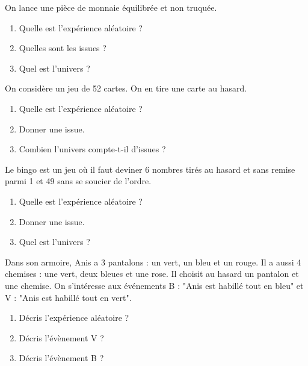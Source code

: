 \begin{pageAD} 


 
On lance une pièce de monnaie équilibrée et non truquée.

\begin{enumerate}
\item Quelle est l'expérience aléatoire ? 
\item Quelles sont les issues ?
\item Quel est l'univers ?
\end{enumerate}



On considère un jeu de 52 cartes. On en tire une carte au hasard. 
\begin{enumerate}
\item Quelle est l'expérience aléatoire ?
\item Donner une issue.
\item Combien l'univers compte-t-il d'issues ?
\end{enumerate}



Le bingo est un jeu où il faut deviner 6 nombres tirés au hasard et sans remise parmi 1 et 49 sans se soucier de l'ordre.
\begin{enumerate}
\item Quelle est l'expérience aléatoire ?
\item Donner une issue.
\item Quel est l'univers ?
\end{enumerate}


 



 

Dans son armoire, Anis a 3 pantalons : un vert, un bleu et un rouge. Il a aussi 4 chemises : une vert, deux bleues et une rose. Il choisit au hasard un pantalon et une chemise. On s'intéresse aux événements B : "Anis est habillé tout en bleu" et V : "Anis est habillé tout en vert".
\begin{enumerate}
\item Décris l'expérience aléatoire ? 
\item Décris l'évènement V ? 
\item Décris l'évènement B ? 
\end{enumerate}




\end{pageAD}  




